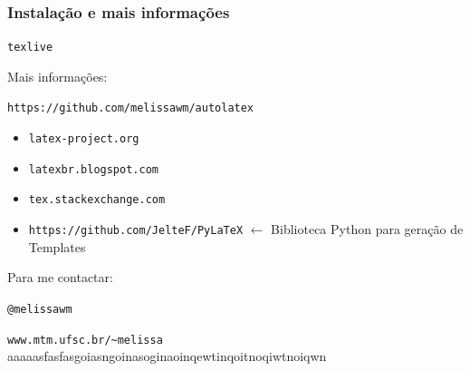 \documentclass{beamer}
\begin{document}
\begin{frame}[fragile]
   \frametitle{Instalação e mais informações}
   \begin{center}
      \verb+texlive+
   \end{center}
   Mais informações:

   \begin{center}
     \verb+https://github.com/melissawm/autolatex+
   \end{center}

   \begin{itemize}
      \item \verb+latex-project.org+
      \item \verb+latexbr.blogspot.com+
      \item \verb+tex.stackexchange.com+
      \item \verb+https://github.com/JelteF/PyLaTeX+ $\leftarrow$ Biblioteca Python para geração de Templates
   \end{itemize}
   Para me contactar:
   \begin{center}
   \verb+@melissawm+
          
   \verb+www.mtm.ufsc.br/~melissa+
   aaaaasfasfasgoiasngoinasoginaoinqewtinqoitnoqiwtnoiqwn
   \end{center}
\end{frame}
\end{document}
